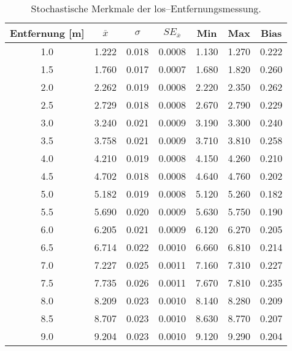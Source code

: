 \begin{appendices}

\begin{table}[h]
	\centering
	\begin{tabular}{||c||ccc||cc||c||}
\hline
Entfernung [\si{\meter}] & $\overline{x}$ & $\sigma$ & $SE_{\overline{x}}$ & Min & Max & Bias \\
\hline
\hline
\num{1.0} & \num{1.222} & \num{0.018} & \num{0.0008} & \num{1.130} & \num{1.270} & \num{0.222} \\
\num{1.5} & \num{1.760} & \num{0.017} & \num{0.0007} & \num{1.680} & \num{1.820} & \num{0.260} \\
\num{2.0} & \num{2.262} & \num{0.019} & \num{0.0008} & \num{2.220} & \num{2.350} & \num{0.262} \\
\num{2.5} & \num{2.729} & \num{0.018} & \num{0.0008} & \num{2.670} & \num{2.790} & \num{0.229} \\
\num{3.0} & \num{3.240} & \num{0.021} & \num{0.0009} & \num{3.190} & \num{3.300} & \num{0.240} \\
\num{3.5} & \num{3.758} & \num{0.021} & \num{0.0009} & \num{3.710} & \num{3.810} & \num{0.258} \\
\num{4.0} & \num{4.210} & \num{0.019} & \num{0.0008} & \num{4.150} & \num{4.260} & \num{0.210} \\
\num{4.5} & \num{4.702} & \num{0.018} & \num{0.0008} & \num{4.640} & \num{4.760} & \num{0.202} \\
\num{5.0} & \num{5.182} & \num{0.019} & \num{0.0008} & \num{5.120} & \num{5.260} & \num{0.182} \\
\num{5.5} & \num{5.690} & \num{0.020} & \num{0.0009} & \num{5.630} & \num{5.750} & \num{0.190} \\
\num{6.0} & \num{6.205} & \num{0.021} & \num{0.0009} & \num{6.120} & \num{6.270} & \num{0.205} \\
\num{6.5} & \num{6.714} & \num{0.022} & \num{0.0010} & \num{6.660} & \num{6.810} & \num{0.214} \\
\num{7.0} & \num{7.227} & \num{0.025} & \num{0.0011} & \num{7.160} & \num{7.310} & \num{0.227} \\
\num{7.5} & \num{7.735} & \num{0.026} & \num{0.0011} & \num{7.670} & \num{7.810} & \num{0.235} \\
\num{8.0} & \num{8.209} & \num{0.023} & \num{0.0010} & \num{8.140} & \num{8.280} & \num{0.209} \\
\num{8.5} & \num{8.707} & \num{0.023} & \num{0.0010} & \num{8.630} & \num{8.770} & \num{0.207} \\
\num{9.0} & \num{9.204} & \num{0.023} & \num{0.0010} & \num{9.120} & \num{9.290} & \num{0.204} \\
\hline
	\end{tabular}
	\caption{Stochastische Merkmale der \Gls{los}--Entfernungsmessung.}
	\label{tab:entfernungsmessung_2018_01_20_los}
\end{table}


\end{appendices}
